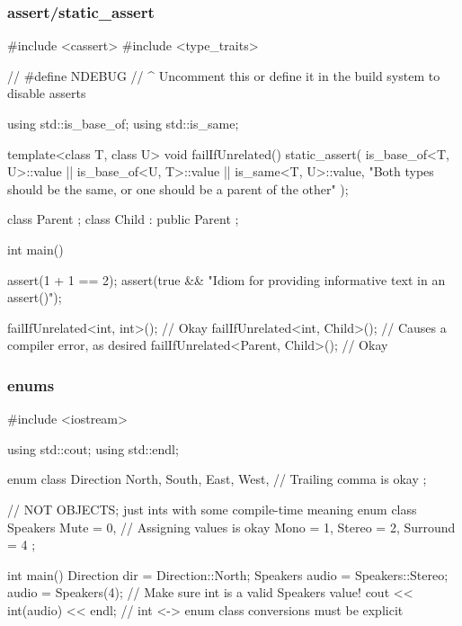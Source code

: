 \documentclass[glossy]{beamer}
\begin{document}
\begin{frame}[fragile=singleslide]
  \frametitle{assert/static\_assert}
  \begin{cppcode}
#include <cassert>
#include <type_traits>

// #define NDEBUG
// ^ Uncomment this or define it in the build system to disable asserts

using std::is_base_of;
using std::is_same;

template<class T, class U>
void failIfUnrelated() {
  static_assert(
    is_base_of<T, U>::value
    || is_base_of<U, T>::value
    || is_same<T, U>::value,
    "Both types should be the same, or one should be a parent of the other"
  );
}

class Parent {};
class Child : public Parent {};

int main() {
  assert(1 + 1 == 2);
  assert(true && "Idiom for providing informative text in an assert()");

  failIfUnrelated<int, int>(); // Okay
  failIfUnrelated<int, Child>(); // Causes a compiler error, as desired
  failIfUnrelated<Parent, Child>(); // Okay
}
  \end{cppcode}
\end{frame}

\begin{frame}[fragile=singleslide]
  \frametitle{enums}
  \begin{cppcode}
#include <iostream> 

using std::cout; 
using std::endl; 

enum class Direction { 
  North, 
  South, 
  East,
  West, // Trailing comma is okay 
}; 

// NOT OBJECTS; just ints with some compile-time meaning 
enum class Speakers { 
  Mute = 0, // Assigning values is okay 
  Mono = 1, 
  Stereo = 2, 
  Surround = 4 
}; 

int main() { 
  Direction dir = Direction::North;
  Speakers audio = Speakers::Stereo;
  audio = Speakers(4); // Make sure int is a valid Speakers value!
  cout << int(audio) << endl;
  // int <-> enum class conversions must be explicit
}
  \end{cppcode}
\end{frame}
\end{document}
